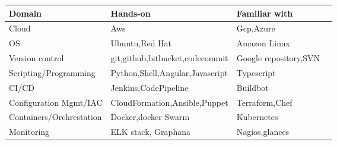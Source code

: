 \documentclass[9pt]{developercv} %
\begin{document}
\begin{tabular}{ |p{5cm}|p{6cm}|p{5cm}|p{3cm}|  }
 
 \hline
 \hspace{0.1cm}\textbf{Domain}& \hspace{0.1cm}\textbf{Hands-on}&\hspace{0.1cm}\textbf{Familiar with}\\
 \hline
\hspace{0.1cm} Cloud   & \hspace{0.1cm}Aws    &\hspace{0.1cm}Gcp,Azure\\
 \hline
 \hspace{0.1cm} OS&  \hspace{0.1cm}Ubuntu,Red Hat & \hspace{0.1cm}Amazon Linux  \\
 \hline
\hspace{0.1cm} Version control&  \hspace{0.1cm}git,github,bitbucket,codecommit & \hspace{0.1cm}Google repository,SVN  \\
 \hline
\hspace{0.1cm} Scripting/Programming &\hspace{0.1cm}Python,Shell,Angular,Javascript & \hspace{0.1cm}Typescript\\
 \hline
\hspace{0.1cm} CI/CD    &\hspace{0.1cm}Jenkins,CodePipeline & \hspace{0.1cm}Buildbot\\
 \hline
\hspace{0.1cm} Configuration Mgmt/IAC &   \hspace{0.1cm}CloudFormation,Ansible,Puppet  & \hspace{0.1cm}Terraform,Chef\\
\hline
\hspace{0.1cm} Containers/Orchrestation& \hspace{0.1cm}Docker,docker Swarm  & \hspace{0.1cm}Kubernetes   \\
 \hline
 
 \hspace{0.1cm} Monitoring& \hspace{0.1cm}ELK stack, Graphana  & \hspace{0.1cm}Nagios,glances\\
 \hline
\end{tabular}
\end{document}
